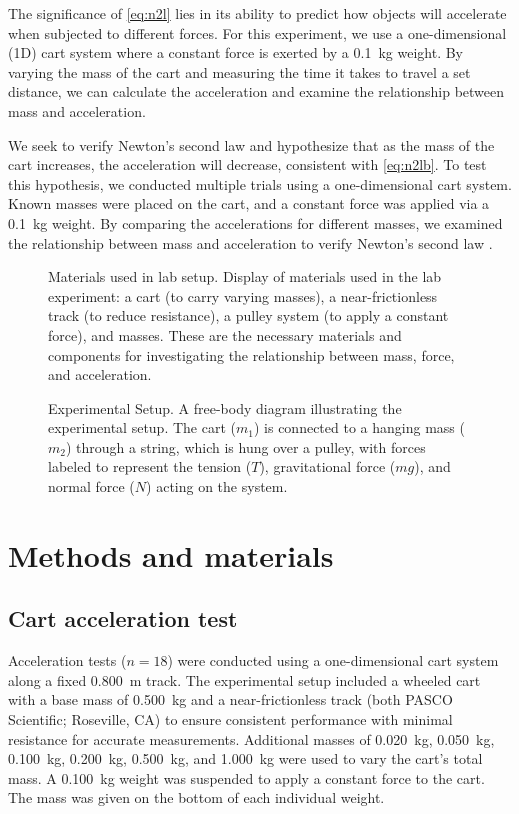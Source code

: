 ﻿\documentclass[reprint,amsmath,amssymb.aps]{revtex4-2}
\begin{document}
The significance of \cref{eq:n2l} lies in its ability to predict how objects will accelerate when subjected to different forces. For this experiment, we use a one-dimensional (1D) cart system where a constant force is exerted by a \qty{0.1}{\kilo\gram} weight. By varying the mass of the cart and measuring the time it takes to travel a set distance, we can calculate the acceleration and examine the relationship between mass and acceleration. 

We seek to verify Newton’s second law and hypothesize that as the mass of the cart increases, the acceleration will decrease, consistent with \cref{eq:n2lb}. To test this hypothesis, we conducted multiple trials using a one-dimensional cart system. Known masses were placed on the cart, and a constant force was applied via a \qty{0.1}{\kilo\gram} weight. By comparing the accelerations for different masses, we examined the relationship between mass and acceleration to verify Newton’s second law \cite{knight2017physics}.

\begin{figure}
\caption{Materials used in lab setup. Display of materials used in the lab experiment: a cart (to carry varying masses), a near-frictionless track (to reduce resistance), a pulley system (to apply a constant force), and masses. These are the necessary materials and components for investigating the relationship between mass, force, and acceleration.}
\label{fig:materials}
\end{figure}

\begin{figure}
\caption{Experimental Setup. A free-body diagram illustrating the experimental setup. The cart ($m_1$) is connected to a hanging mass ($m_2$) through a string, which is hung over a pulley, with forces labeled to represent the tension ($T$), gravitational force ($mg$), and normal force ($N$) acting on the system.}
\label{fig:fbd}
\end{figure}






\section{Methods and materials}

\subsection{Cart acceleration test}
Acceleration tests ($n=18$) were conducted using a one-dimensional cart system along a fixed \qty{0.800}{\meter} track. The experimental setup included a wheeled cart with a base mass of \qty{0.500}{\kilo\gram} and a near-frictionless track (both PASCO Scientific; Roseville, CA) to ensure consistent performance with minimal resistance for accurate measurements. Additional masses of \qty{0.020}{\kilo\gram}, \qty{0.050}{\kilo\gram}, \qty{0.100}{\kilo\gram}, \qty{0.200}{\kilo\gram}, \qty{0.500}{\kilo\gram}, and \qty{1.000}{\kilo\gram} were used to vary the cart’s total mass. A \qty{0.100}{\kilo\gram} weight was suspended to apply a constant force to the cart. The mass was given on the bottom of each individual weight. 
\end{document}
